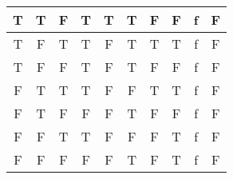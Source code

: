 \documentclass[a4paper,12pt]{article}
\begin{document}
\begin{center}
{\begin{tabular}{|c c c|c|c|c|c|c|c|c|}
        \hline
        T                    & T                       & F                       & T                       & T                       & T                       & F                       & F           & f           & F            \\
        \hline
        T                    & F                       & T                       & T                       & F                       & T                       & T                       & T           & f           & F            \\
        \hline
        T                    & F                       & F                       & T                       & F                       & T                       & F                       & F           & f           & F            \\
        \hline
        F                    & T                       & T                       & T                       & F                       & F                       & T                       & T           & f           & F            \\
        \hline
        F                    & T                       & F                       & F                       & F                       & T                       & F                       & F           & f           & F            \\
        \hline
        F                    & F                       & T                       & T                       & F                       & F                       & F                       & T           & f           & F            \\
        \hline
        F                    & F                       & F                       & F                       & F                       & T                       & F                       & T           & f           & F            \\
        \hline
    \end{tabular}}
    \ \\\ \\
\end{center}
\end{document}
